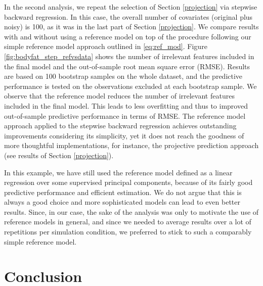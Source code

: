\documentclass[american,]{article}
\theoremstyle{definition}
\begin{document}
In the second analysis, we repeat the selection of Section
\ref{projection} via stepwise backward regression. In this case, the
overall number of covariates (original plus noisy) is 100, as it was
in the last part of Section \ref{projection}. We compare results with
and without using a reference model on top of the procedure following
our simple reference model approach outlined in
\eqref{eq:ref_mod}. Figure \ref{fig:bodyfat_step_refvsdata} shows the
number of irrelevant features included in the final model and the
out-of-sample root mean square error (RMSE). Results are based on 100
bootstrap samples on the whole dataset, and the predictive performance
is tested on the observations excluded at each bootstrap sample. We
observe that the reference model reduces the number of irrelevant
features included in the final model. This leads to less overfitting
and thus to improved out-of-sample predictive performance in terms of
RMSE. The reference model approach applied to the stepwise backward
regression achieves outstanding improvements considering its
simplicity, yet it does not reach the goodness of more thoughtful
implementations, for instance, the projective prediction approach (see
results of Section \ref{projection}).

In this example, we have still used the reference model defined as a
linear regression over some supervised principal components, because
of its fairly good predictive performance and efficient estimation. We
do not argue that this is always a good choice and more sophisticated
models can lead to even better results. Since, in our case, the sake
of the analysis was only to motivate the use of reference models in
general, and since we needed to average results over a lot of
repetitions per simulation condition, we preferred to stick to such a
comparably simple reference model.


\hypertarget{conclusion}{%
\section{Conclusion}\label{conclusion}}
\end{document}
